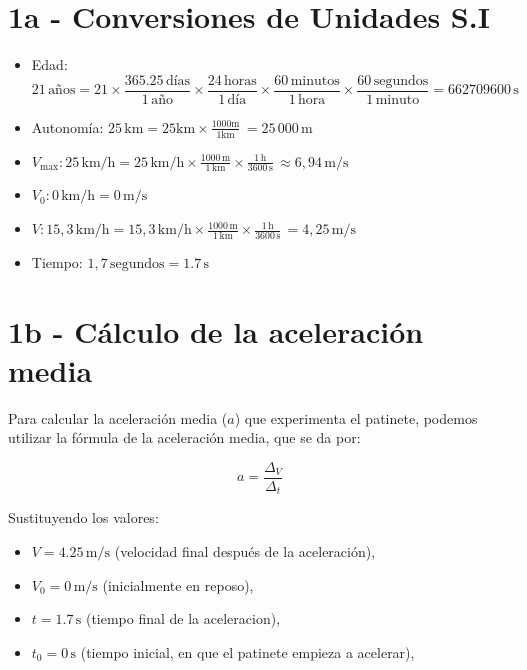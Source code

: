 \documentclass{article}
\begin{document}

\section*{1a - Conversiones de Unidades S.I}

\begin{itemize}
    \item Edad: \[
21 \, \text{años} = 21 \times \frac{365.25 \, \text{días}}{1 \, \text{año}} \times \frac{24 \, \text{horas}}{1 \, \text{día}} \times \frac{60 \, \text{minutos}}{1 \, \text{hora}} \times \frac{60 \, \text{segundos}}{1 \, \text{minuto}} = \boxed{662709600\, \text{s}}
\]
    \item Autonomía: \(25 \, \text{km} = 25 \text{km}\times \frac{1000 \text{m}}{1 \text{km}}{} \, = \boxed{25\,000 \, \text{m}}\)
    \item \(V_{\text{max}}: 25 \, \text{km/h} = 25\, \text{km/h} \times \frac{1000\,\text{m}}{1\,\text{km}} \times \frac{1\,\text{h}}{3600\,\text{s}} \, \approx \boxed{6,94 \, \text{m/s}} \)
    \item \(V_0: 0 \, \text{km/h} = \boxed{0 \, \text{m/s}}\)
    \item \(V: 15,3 \, \text{km/h} = 15,3\, \text{km/h} \times \frac{1000\,\text{m}}{1\,\text{km}} \times \frac{1\,\text{h}}{3600\,\text{s}} \, = \boxed{4,25 \, \text{m/s}} \)
    \item Tiempo: \(1,7 \, \text{segundos} = \boxed{1.7 \, \text{s}}\)
\end{itemize}


\section*{1b - Cálculo de la aceleración media}

Para calcular la aceleración media (\(a\)) que experimenta el patinete, podemos utilizar la fórmula de la aceleración media, que se da por:

\[
a = \frac{\Delta_V}{\Delta_t}
\]

Sustituyendo los valores:

\begin{itemize}
    \item \(V = 4.25 \, \text{m/s}\) (velocidad final después de la aceleración),
    \item \(V_0 = 0 \, \text{m/s}\) (inicialmente en reposo),
    \item \(t = 1.7 \, \text{s}\) (tiempo final de la aceleracion),
    \item \(t_0 = 0 \, \text{s}\) (tiempo inicial, en que el patinete empieza a acelerar),

\end{itemize}
\end{document}
